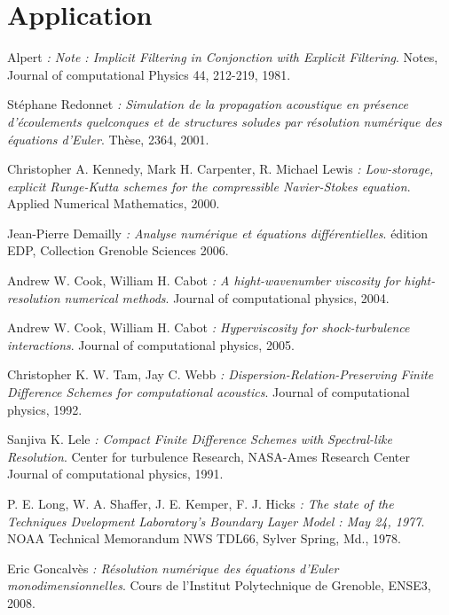 \documentclass[10pt,a4paper]{amsart}
\begin{document}
\section{Application}








\newpage

\begin{thebibliography}{9}
        
         Alpert
         \emph{: Note :  Implicit Filtering in Conjonction with Explicit Filtering}.
         Notes,
         Journal of computational Physics 44,
         212-219,
         1981.

         Stéphane Redonnet
         \emph{:  Simulation de la propagation acoustique en présence d'écoulements quelconques et de structures soludes par résolution numérique des équations d'Euler}.
         Thèse,
         2364,
         2001.
         
         Christopher A. Kennedy, Mark H. Carpenter, R. Michael Lewis
         \emph{:  Low-storage, explicit Runge-Kutta schemes for the compressible Navier-Stokes equation}.
         Applied Numerical Mathematics,
         2000.
         
         Jean-Pierre Demailly
         \emph{:  Analyse numérique et équations différentielles}.
         édition EDP,
         Collection Grenoble Sciences
         2006.
         
         Andrew W. Cook, William H. Cabot
         \emph{:  A hight-wavenumber viscosity for hight-resolution numerical methods}.
         Journal of computational physics,
         2004.
         
         Andrew W. Cook, William H. Cabot
         \emph{:  Hyperviscosity for shock-turbulence interactions}.
         Journal of computational physics,
         2005.
         
         Christopher K. W. Tam, Jay C. Webb
         \emph{:  Dispersion-Relation-Preserving Finite Difference Schemes for computational acoustics}.
         Journal of computational physics,
         1992.
         
         Sanjiva K. Lele
         \emph{:  Compact Finite Difference Schemes with Spectral-like Resolution}.
         Center for turbulence Research, NASA-Ames Research Center
         Journal of computational physics,
         1991.

         P. E. Long, W. A. Shaffer, J. E. Kemper, F. J. Hicks
         \emph{:  The state of the Techniques Dvelopment Laboratory's Boundary Layer Model : May 24, 1977}.
         NOAA Technical Memorandum NWS TDL66,
         Sylver Spring,
         Md.,
         1978.
         
         Eric Goncalvès
         \emph{:  Résolution numérique des équations d'Euler monodimensionnelles}.
         Cours de l'Institut Polytechnique de Grenoble,
         ENSE3,
         2008.

		
\end{thebibliography}
\end{document}
